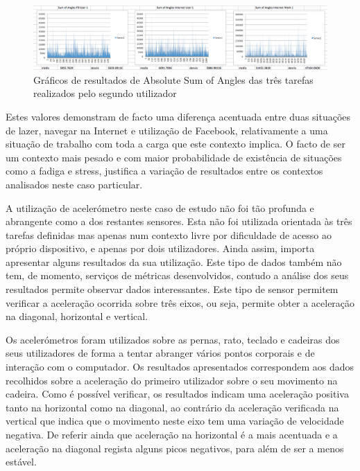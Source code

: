  \begin{figure}[htb]
   \centering
   \includegraphics[scale=0.3]{Images/sumofangles.png}
   \caption{Gráficos de resultados de Absolute Sum of Angles das três tarefas realizados pelo segundo utilizador}
\end{figure}

Estes valores demonstram de facto uma diferença acentuada entre duas situações de lazer, navegar na Internet e utilização de Facebook, relativamente a uma situação de trabalho com toda a carga que este contexto implica. O facto de ser um contexto mais pesado e com maior probabilidade de existência de situações como a fadiga e stress, justifica a variação de resultados entre os contextos analisados neste caso particular.



A utilização de acelerómetro neste caso de estudo não foi tão profunda e abrangente como a dos restantes sensores. Esta não foi utilizada orientada às três tarefas definidas mas apenas num contexto livre por dificuldade de acesso ao próprio dispositivo, e apenas por dois utilizadores. Ainda assim, importa apresentar alguns resultados da sua utilização. Este tipo de dados também não tem, de momento, serviços de métricas desenvolvidos, contudo a análise dos seus resultados permite observar dados interessantes. Este tipo de sensor permitem verificar a aceleração ocorrida sobre três eixos, ou seja, permite obter a aceleração na diagonal, horizontal e vertical.

Os acelerómetros foram utilizados sobre as pernas, rato, teclado e cadeiras dos seus utilizadores de forma a tentar abranger vários pontos corporais e de interação com o computador. Os resultados apresentados correspondem aos dados recolhidos sobre a aceleração do primeiro utilizador sobre o seu movimento na cadeira. Como é possível verificar, os resultados indicam uma aceleração positiva tanto na horizontal como na diagonal, ao contrário da aceleração verificada na vertical que indica que o movimento neste eixo tem uma variação de velocidade negativa. De referir ainda que aceleração na horizontal é a mais acentuada e a aceleração na diagonal regista alguns picos negativos, para além de ser a menos estável.

